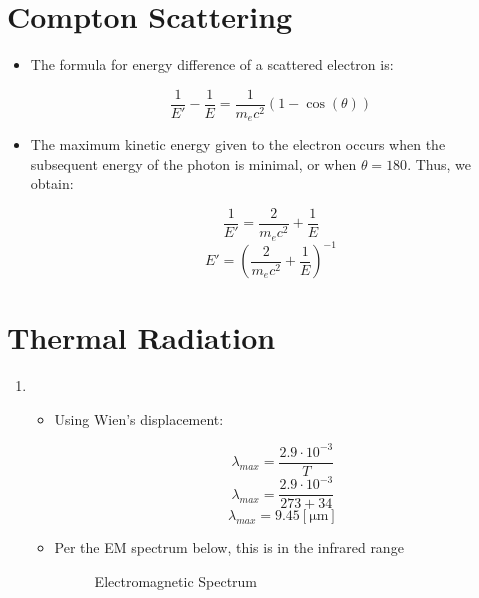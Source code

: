 \begin{enumerate}
\begin{enumerate}
\begin{itemize}
        \end{itemize}

    \end{enumerate}

    \section*{Compton Scattering}

    \begin{itemize}

      \item The formula for energy difference of a scattered electron is:

        $$\dfrac{1}{E'}-\dfrac{1}{E}=\dfrac{1}{m_ec^2}(1-\cos(\theta))$$

      \item The maximum kinetic energy given to the electron occurs when the subsequent energy of the photon is minimal, or when $\theta = 180$. Thus, we obtain:

        $$\dfrac{1}{E'}=\dfrac{2}{m_ec^2}+\dfrac{1}{E}$$
        $$E'=\left(\dfrac{2}{m_ec^2}+\dfrac{1}{E}\right)^{-1}$$

    \end{itemize}

    \section*{Thermal Radiation}

    \begin{enumerate}

      \item 

        \begin{itemize}

          \item Using Wien's displacement:

            $$\lambda_{max}=\dfrac{2.9\cdot10^{-3}}{T}$$
            $$\lambda_{max}=\dfrac{2.9\cdot10^{-3}}{273+34}$$
            $$\lambda_{max}=9.45[\si{\micro\meter}]$$

          \item Per the EM spectrum below, this is in the infrared range

            \begin{figure}[h!]
              \centering
              
              \caption{Electromagnetic Spectrum}
              \label{fig:1}
            \end{figure}


\end{itemize}
\end{enumerate}
\end{enumerate}
